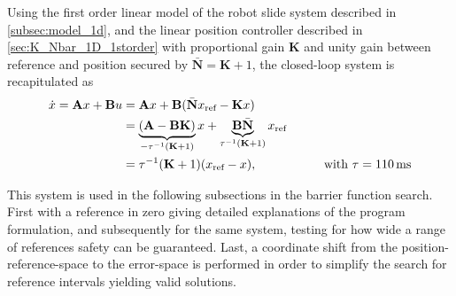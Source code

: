 Using the first order linear model of the robot slide system described in \autoref{subsec:model_1d}, and  the linear position controller described in \autoref{sec:K_Nbar_1D_1storder} with proportional gain \textbf{K} and unity gain between reference and position secured by $\bar{\mathbf{N}}=\textbf{K}+1$, %
the closed-loop system is recapitulated as
\vspace{-1mm}
\begin{align}
\dot{x} = \textbf{A}x+\textbf{B}u &= \textbf{A}x+\textbf{B}(\bar{\mathbf{N}}x_\text{ref}-\textbf{K}x)\nonumber\\
&= \underbrace{(\textbf{A} - \textbf{B}\textbf{K})}_{-\tau^{-1}(\textbf{K}+1)} x + \underbrace{\textbf{B}\bar{\textbf{N}}}_{\tau^{-1}(\textbf{K}+1)} x_\text{ref} \nonumber\\
& = %
\tau^{-1}(\mathbf{K}+1)(x_\text{ref}-x),
\kk\kk\mm \text{with }\tau=110\,\text{ms}\label{eq:sos_firstorder}
\end{align}


This system is used in the following subsections in the barrier function search.
First with a reference in zero giving detailed explanations of the program formulation, and subsequently for the same system, testing for how wide a range of references safety can be guaranteed. Last, a coordinate shift from the position-reference-space to the error-space is performed in order to simplify the search for reference intervals yielding valid solutions.

